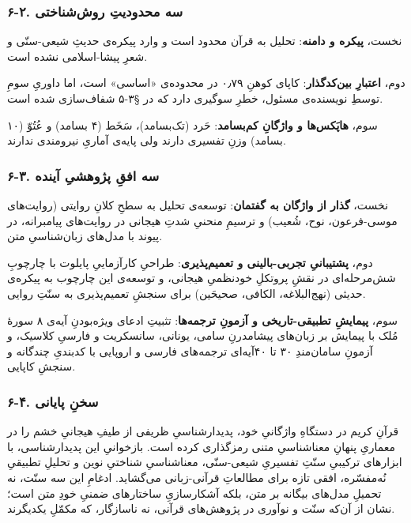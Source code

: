 \begin{RTL}
\begin{otherlanguage}{persian}
\subsubsection{۶-۲. سه محدودیتِ
روش‌شناختی}\label{ux633ux647-ux645ux62dux62fux648ux62fux6ccux62a-ux631ux648ux634ux634ux646ux627ux62eux62aux6cc}

نخست، \textbf{پیکره و دامنه}: تحلیل به قرآن محدود است و وارد پیکره‌ی حدیثِ
شیعی-سنّی و شعرِ پیشا-اسلامی نشده است.

دوم، \textbf{اعتبارِ بین‌کدگذار}: کاپای کوهنِ ۰٫۷۹ در محدوده‌ی «اساسی» است،
اما داوریِ سومِ توسطِ نویسنده‌ی مسئول، خطرِ سوگیری دارد که در §۳-۵ شفاف‌سازی
شده است.

سوم، \textbf{هاپَکس‌ها و واژگانِ کم‌بسامد}: حَرد (تک‌بسامد)، سَخَط (۴ بسامد) و
عُتُوّ (۱۰ بسامد) وزنِ تفسیری دارند ولی پایه‌ی آماریِ نیرومندی ندارند.

\subsubsection{۶-۳. سه افقِ پژوهشیِ
آینده}\label{ux633ux647-ux627ux641ux642-ux67eux698ux648ux647ux634ux6cc-ux622ux6ccux646ux62fux647}

نخست، \textbf{گذار از واژگان به گفتمان}: توسعه‌ی تحلیل به سطحِ کلانِ روایتی
(روایت‌های موسی-فرعون، نوح، شُعیب) و ترسیمِ منحنیِ شدتِ هیجانی در روایت‌های
پیامبرانه، در پیوند با مدل‌های زبان‌شناسیِ متن.

دوم، \textbf{پشتیبانیِ تجربی-بالینی و تعمیم‌پذیری}: طراحیِ کارآزماییِ پایلوت
با چارچوبِ شش‌مرحله‌ای در نقشِ پروتکلِ خودنظمیِ هیجانی، و توسعه‌ی این چارچوب به
پیکره‌ی حدیثی (نهج‌البلاغه، الکافی، صحیحَین) برای سنجشِ تعمیم‌پذیری به سنّتِ
روایی.

سوم، \textbf{پیمایشِ تطبیقی-تاریخی و آزمونِ ترجمه‌ها}: تثبیتِ ادعای ویژه‌بودنِ
آیه‌ی ۸ سورۀ مُلک با پیمایش بر زبان‌های پیشامدرنِ سامی، یونانی، سانسکریت و
فارسیِ کلاسیک، و آزمونِ سامان‌مندِ ۳۰ تا ۴۰‌آیه‌ای ترجمه‌های فارسی و اروپایی با
کدبندیِ چندگانه و سنجشِ کاپایی.

\subsubsection{۶-۴. سخنِ
پایانی}\label{ux633ux62eux646-ux67eux627ux6ccux627ux646ux6cc}

قرآنِ کریم در دستگاهِ واژگانیِ خود، پدیدارشناسیِ ظریفی از طیفِ هیجانیِ خشم را
در معماریِ پنهانِ معناشناسیِ متنی رمزگذاری کرده است. بازخوانیِ این
پدیدارشناسی، با ابزارهای ترکیبیِ سنّتِ تفسیریِ شیعی-سنّی، معناشناسیِ شناختیِ
نوین و تحلیلِ تطبیقیِ نُه‌مفسّره، افقی تازه برای مطالعاتِ قرآنی-زبانی می‌گشاید.
ادغامِ این سه سنّت، نه تحمیلِ مدل‌های بیگانه بر متن، بلکه آشکارسازیِ
ساختارهای ضمنیِ خودِ متن است؛ نشان از آن‌که سنّت و نوآوری در پژوهش‌های قرآنی،
نه ناسازگار، که مکمّلِ یکدیگرند.


\end{otherlanguage}
\end{RTL}
